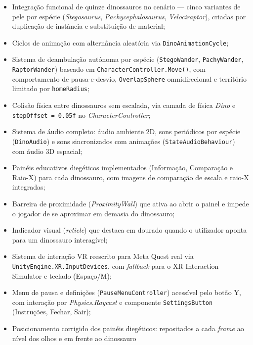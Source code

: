 \documentclass[a4paper,11pt]{report}
\newcommand{\code}[1]{\texttt{#1}}
\begin{document}
\begin{itemize}
    \setlength\itemsep{0pt}
    \item Integração funcional de quinze dinossauros no cenário --- cinco
          variantes de pele por espécie (\textit{Stegosaurus},
          \textit{Pachycephalosaurus}, \textit{Velociraptor}), criadas por
          duplicação de instância e substituição de material;
    \item Ciclos de animação com alternância aleatória via \code{DinoAnimationCycle};
    \item Sistema de deambulação autónoma por espécie (\code{StegoWander},
          \code{PachyWander}, \code{RaptorWander}) baseado em
          \code{CharacterController.Move()}, com comportamento de pausa-e-desvio,
          \code{OverlapSphere} omnidirecional e território limitado por
          \code{homeRadius};
    \item Colisão física entre dinossauros sem escalada, via camada de física
          \textit{Dino} e \code{stepOffset = 0.05f} no \textit{CharacterController};
    \item Sistema de áudio completo: áudio ambiente 2D, sons periódicos por
          espécie (\code{DinoAudio}) e sons sincronizados com animações
          (\code{StateAudioBehaviour}) com áudio 3D espacial;
    \item Painéis educativos diegéticos implementados (Informação, Comparação
          e Raio-X) para cada dinossauro, com imagens de comparação de escala
          e raio-X integradas;
    \item Barreira de proximidade (\textit{ProximityWall}) que ativa ao abrir
          o painel e impede o jogador de se aproximar em demasia do dinossauro;
    \item Indicador visual (\textit{reticle}) que destaca em dourado quando o
          utilizador aponta para um dinossauro interagível;
    \item Sistema de interação VR reescrito para Meta Quest real via
          \code{UnityEngine.XR.InputDevices}, com \textit{fallback} para o
          XR Interaction Simulator e teclado (Espaço/M);
    \item Menu de pausa e definições (\code{PauseMenuController}) acessível
          pelo botão Y, com interação por \textit{Physics.Raycast} e componente
          \code{SettingsButton} (Instruções, Fechar, Sair);
    \item Posicionamento corrigido dos painéis diegéticos: repositados a cada
          \textit{frame} ao nível dos olhos e em frente ao dinossauro

\end{itemize}
\end{document}
